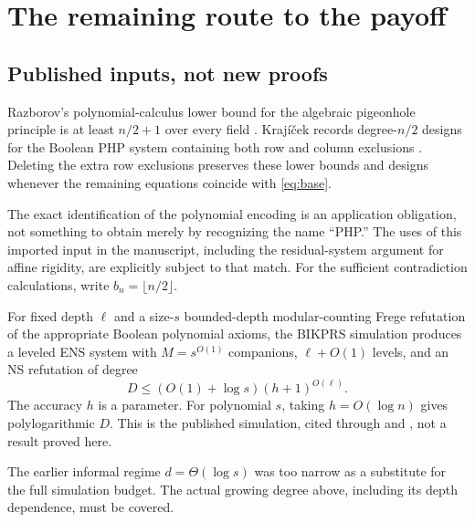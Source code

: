 \chapter{The remaining route to the payoff}\label{ch:route}

\section{Published inputs, not new proofs}
\begin{imported}\label{imp:php}
Razborov's polynomial-calculus lower bound for the algebraic pigeonhole principle is at least $n/2+1$ over every field \cite{Razborov}. Kraj\'i\v{c}ek records degree-$n/2$ designs for the Boolean PHP system containing both row and column exclusions \cite[Lemma 4.1]{Krajicek}. Deleting the extra row exclusions preserves these lower bounds and designs whenever the remaining equations coincide with \eqref{eq:base}.
\end{imported}

The exact identification of the polynomial encoding is an application obligation, not something to obtain merely by recognizing the name ``PHP.'' The uses of this imported input in the manuscript, including the residual-system argument for affine rigidity, are explicitly subject to that match. For the sufficient contradiction calculations, write $b_n=\lfloor n/2\rfloor$.

\begin{imported}\label{imp:simulation}
For fixed depth $\ell$ and a size-$s$ bounded-depth modular-counting Frege refutation of the appropriate Boolean polynomial axioms, the BIKPRS simulation produces a leveled ENS system with $M=s^{O(1)}$ companions, $\ell+O(1)$ levels, and an NS refutation of degree
\[
 D\le (O(1)+\log s)(h+1)^{O(\ell)}.
\]
The accuracy $h$ is a parameter. For polynomial $s$, taking $h=O(\log n)$ gives polylogarithmic $D$. This is the published simulation, cited through \cite[Theorem 5.2]{Krajicek} and \cite{BIKPRS}, not a result proved here.
\end{imported}

The earlier informal regime $d=\Theta(\log s)$ was too narrow as a substitute for the full simulation budget. The actual growing degree above, including its depth dependence, must be covered.

